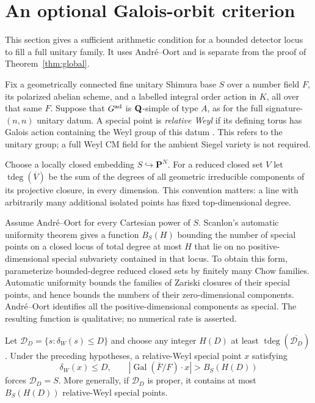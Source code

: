 \section{An optional Galois-orbit criterion}
\label{sec:galois}
This section gives a sufficient arithmetic condition for a bounded detector locus to fill a full unitary family. It uses Andr\'e--Oort and is separate from the proof of Theorem~\ref{thm:global}.

Fix a geometrically connected fine unitary Shimura base $S$ over a number field $F$, its polarized abelian scheme, and a labelled integral order action in $K$, all over that same $F$. Suppose that $G^{\rm ad}$ is $\mathbf Q$-simple of type $A$, as for the full signature-$(n,n)$ unitary datum. A special point is \emph{relative Weyl} if its defining torus has Galois action containing the Weyl group of this datum \cite[Definitions~5.3--5.4]{ChaiOort}. This refers to the unitary group; a full Weyl CM field for the ambient Siegel variety is not required.

Choose a locally closed embedding $S\hookrightarrow\mathbf P^N$. For a reduced closed set $V$ let $\operatorname{tdeg}(\overline V)$ be the sum of the degrees of all geometric irreducible components of its projective closure, in every dimension. This convention matters: a line with arbitrarily many additional isolated points has fixed top-dimensional degree.

Assume Andr\'e--Oort for every Cartesian power of $S$. Scanlon's automatic uniformity theorem \cite[Theorem~4.2]{Scanlon} gives a function $B_S(H)$ bounding the number of special points on a closed locus of total degree at most $H$ that lie on no positive-dimensional special subvariety contained in that locus. To obtain this form, parameterize bounded-degree reduced closed sets by finitely many Chow families. Automatic uniformity bounds the families of Zariski closures of their special points, and hence bounds the numbers of their zero-dimensional components. Andr\'e--Oort identifies all the positive-dimensional components as special. The resulting function is qualitative; no numerical rate is asserted.

\begin{proposition}\label{prop:galois-witness}
Let $\mathcal D_D=\{s:\delta_W(s)\leq D\}$ and choose any integer $H(D)$ at least $\operatorname{tdeg}(\overline{\mathcal D_D})$. Under the preceding hypotheses, a relative-Weyl special point $x$ satisfying
\[
 \delta_W(x)\leq D,\qquad
 |\operatorname{Gal}(\overline F/F)\cdot x|>B_S(H(D))
\]
forces $\mathcal D_D=S$. More generally, if $\mathcal D_D$ is proper, it contains at most $B_S(H(D))$ relative-Weyl special points.
\end{proposition}

